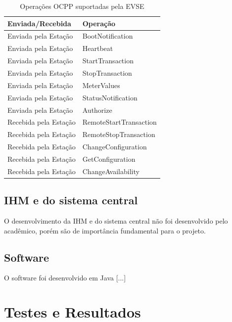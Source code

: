       \begin{table}[]
        \centering
        \caption{Operações OCPP suportadas pela \ac{EVSE}}
        \label{table:ocpp}
        \begin{tabular}{@{}ll@{}}
          \toprule
          \textbf{Enviada/Recebida} & \textbf{Operação}      \\ \midrule
            Enviada pela Estação      & BootNotification       \\
            Enviada pela Estação      & Heartbeat              \\
            Enviada pela Estação      & StartTransaction       \\
            Enviada pela Estação      & StopTransaction        \\
            Enviada pela Estação      & MeterValues            \\
            Enviada pela Estação      & StatusNotification     \\
            Enviada pela Estação      & Authorize              \\
            Recebida pela Estação     & RemoteStartTransaction \\
            Recebida pela Estação     & RemoteStopTransaction  \\
            Recebida pela Estação     & ChangeConfiguration    \\
            Recebida pela Estação     & GetConfiguration       \\
            Recebida pela Estação     & ChangeAvailability     \\ \bottomrule
        \end{tabular}
      \end{table}

    \subsection{\ac{IHM} e do sistema central}

      O desenvolvimento da IHM e do sistema central não foi desenvolvido pelo acadêmico, porém são de importância fundamental para o projeto.

    \subsection{Software}

      O software foi desenvolvido em Java [...]

  \section{Testes e Resultados}


